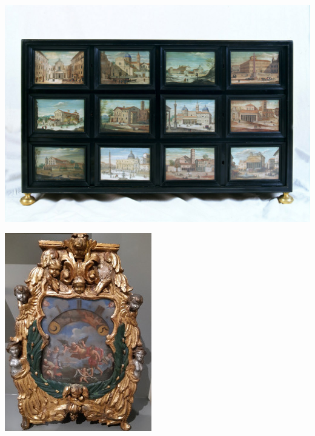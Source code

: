 \documentclass[12pt,a4paper]{article}
\begin{document}
\begin{enumerate}
	\begin{minipage}{\linewidth}
		\centering
		\begin{minipage}{0.4\linewidth}
			\includegraphics[scale=0.2]{Vedute_di_Roma.jpg}
		\end{minipage}
		\hfill
		\begin{minipage}{0.4\linewidth}
			\includegraphics[scale=1.85]{Orologio_Notturno.jpg}
		\end{minipage}
	\end{minipage}
	

\end{enumerate}
\end{document}
